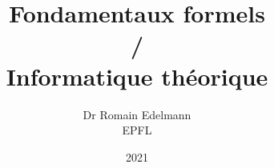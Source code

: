 \documentclass[12pt,french,a4paper]{memoir}
\begin{document}
\title{Fondamentaux formels\\/\\Informatique théorique}
\author{Dr Romain Edelmann\\EPFL}
\date{2021}
\maketitle

\frontmatter

\tableofcontents

\mainmatter








\end{document}
